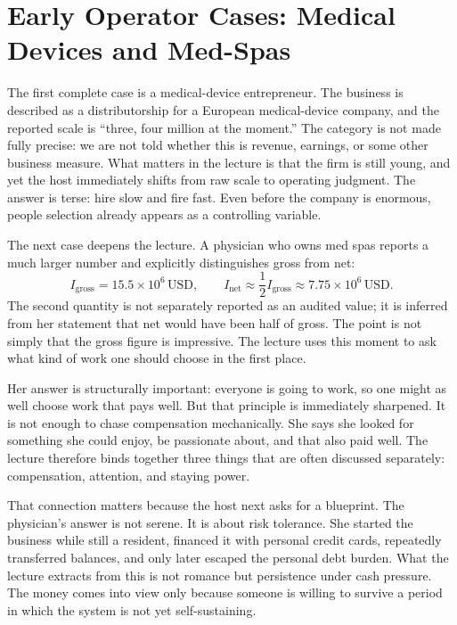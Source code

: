 \section{Early Operator Cases: Medical Devices and Med-Spas}

The first complete case is a medical-device entrepreneur. The business is described as a distributorship for a European medical-device company, and the reported scale is ``three, four million at the moment.'' The category is not made fully precise: we are not told whether this is revenue, earnings, or some other business measure. What matters in the lecture is that the firm is still young, and yet the host immediately shifts from raw scale to operating judgment. The answer is terse: hire slow and fire fast. Even before the company is enormous, people selection already appears as a controlling variable.

The next case deepens the lecture. A physician who owns med spas reports a much larger number and explicitly distinguishes gross from net:
\begin{equation}
I_{\mathrm{gross}} = 15.5 \times 10^6 \,\mathrm{USD}, \qquad
I_{\mathrm{net}} \approx \frac{1}{2} I_{\mathrm{gross}} \approx 7.75 \times 10^6 \,\mathrm{USD}.
\end{equation}
The second quantity is not separately reported as an audited value; it is inferred from her statement that net would have been half of gross. The point is not simply that the gross figure is impressive. The lecture uses this moment to ask what kind of work one should choose in the first place.

Her answer is structurally important: everyone is going to work, so one might as well choose work that pays well. But that principle is immediately sharpened. It is not enough to chase compensation mechanically. She says she looked for something she could enjoy, be passionate about, and that also paid well. The lecture therefore binds together three things that are often discussed separately: compensation, attention, and staying power.

That connection matters because the host next asks for a blueprint. The physician's answer is not serene. It is about risk tolerance. She started the business while still a resident, financed it with personal credit cards, repeatedly transferred balances, and only later escaped the personal debt burden. What the lecture extracts from this is not romance but persistence under cash pressure. The money comes into view only because someone is willing to survive a period in which the system is not yet self-sustaining.

